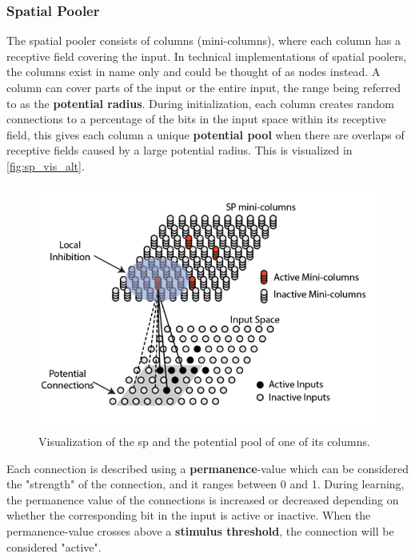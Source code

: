 \subsubsection{Spatial Pooler}
\label{sec:spatial_pooler}
The spatial pooler consists of columns (mini-columns), where each column has a receptive field covering the input. In technical implementations of spatial poolers, the columns exist in name only and could be thought of as nodes instead. A column can cover parts of the input or the entire input, the range being referred to as the \textbf{potential radius}. During initialization, each column creates random connections to a percentage of the bits in the input space within its receptive field, this gives each column a unique \textbf{potential pool} when there are overlaps of receptive fields caused by a large potential radius. This is visualized in \autoref{fig:sp_vis_alt}.\par
\begin{figure}[htb]
    \centering
    \includegraphics[width=0.8\linewidth]{resources/related_works/sp_vis_alt}
    \caption[Spatial Pooler Visualization]{Visualization of the \gls*{sp} and the potential pool of one of its columns.}
    \label{fig:sp_vis_alt}
\end{figure}
\par
Each connection is described using a \textbf{permanence}-value which can be considered the "strength" of the connection, and it ranges between 0 and 1. During learning, the permanence value of the connections is increased or decreased depending on whether the corresponding bit in the input is active or inactive. When the permanence-value crosses above a \textbf{stimulus threshold}, the connection will be considered "active".

